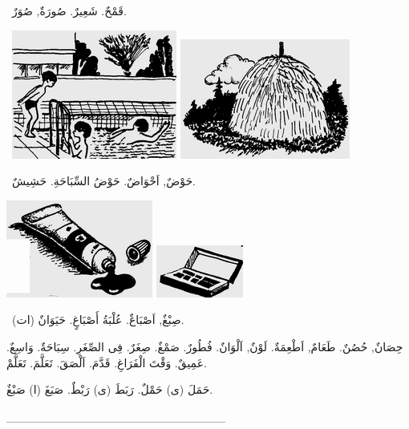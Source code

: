 \documentclass[a5paper]{article}
\begin{document}
\ قَمْحٌ. شَعِيرٌ. صُورَةٌ, صُوَرٌ.

\  \includegraphics[width=2.1354in,height=1.6665in]{MuhammadBagauddinlatinized-img108.png}   \includegraphics[width=2.198in,height=1.552in]{MuhammadBagauddinlatinized-img109.png} 

\ حَوْضٌ, اَحْوَاضٌ. حَوْضُ السِّبَاحَةِ. حَشِيشٌ. 

 \includegraphics[width=1.8957in,height=1.2602in]{MuhammadBagauddinlatinized-img110.png}   \includegraphics[width=1.1252in,height=0.6772in]{MuhammadBagauddinlatinized-img111.png} 

\ صِبْغٌ, اَصْبَاغٌ. عُلْبَةُ أَصْبَاغٍ. حَيَوَانٌ (ات). 

حِصَانٌ, حُصُنٌ. طَعَامٌ, اَطْعِمَةٌ. لَوْنٌ, اَلْوَانٌ. فُطُورٌ. صَمْغٌ. صِغَرٌ. فِى الصِّغَرِ. سِبَاحَةٌ. وَاسِعٌ. عَمِيقٌ. وَقْتَ الْفَرَاغِ. قَدَّمَ. اَلْصَقَ. تَعَلَّمَ. تَعَلَّمْ. 

حَمَلَ (ى) حَمْلٌ. رَبَطَ (ى) رَبْطٌ. صَبَغَ (ا) صَبْغٌ.

\_\_\_\_\_\_\_\_\_\_\_\_\_\_\_\_\_\_\_\_\_\_\_\_\_\_
\end{document}
